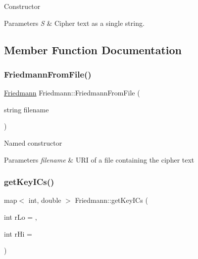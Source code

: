 Constructor


\begin{DoxyParams}{Parameters}
{\em S} & Cipher text as a single string. \\
\hline
\end{DoxyParams}


\subsection{Member Function Documentation}
\mbox{\label{classFriedmann_ad096c7c2b3e83b56a55cd119f220c73d}} 
\subsubsection{\texorpdfstring{Friedmann\+From\+File()}{FriedmannFromFile()}}
{\footnotesize\ttfamily \hyperlink{classFriedmann}{Friedmann} Friedmann\+::\+Friedmann\+From\+File (\begin{DoxyParamCaption}\item[{string}]{filename }\end{DoxyParamCaption})\hspace{0.3cm}{\ttfamily [static]}}

Named constructor


\begin{DoxyParams}{Parameters}
{\em filename} & U\+RI of a file containing the cipher text \\
\hline
\end{DoxyParams}
\mbox{\label{classFriedmann_ad8b6d559d8beb795a45d95601039dc05}} 
\subsubsection{\texorpdfstring{get\+Key\+I\+Cs()}{getKeyICs()}}
{\footnotesize\ttfamily map$<$ int, double $>$ Friedmann\+::get\+Key\+I\+Cs (\begin{DoxyParamCaption}\item[{int}]{r\+Lo = {},  }\item[{int}]{r\+Hi = {} }\end{DoxyParamCaption})}

